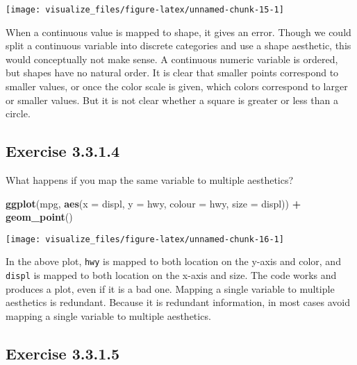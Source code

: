 \documentclass[]{book}
\newenvironment{Shaded}{\begin{snugshade}}{\end{snugshade}}
\newcommand{\DataTypeTok}[1]{\textcolor[rgb]{0.13,0.29,0.53}{#1}}
\newcommand{\KeywordTok}[1]{\textcolor[rgb]{0.13,0.29,0.53}{\textbf{#1}}}
\newcommand{\NormalTok}[1]{#1}
\newcommand{\OperatorTok}[1]{\textcolor[rgb]{0.81,0.36,0.00}{\textbf{#1}}}
\newcommand{\StringTok}[1]{\textcolor[rgb]{0.31,0.60,0.02}{#1}}
\theoremstyle{plain}
\theoremstyle{remark}
\begin{document}
\begin{center}\texttt{[image: visualize\_files/figure-latex/unnamed-chunk-15-1]} \end{center}

When a continuous value is mapped to shape, it gives an error. Though we
could split a continuous variable into discrete categories and use a
shape aesthetic, this would conceptually not make sense. A continuous
numeric variable is ordered, but shapes have no natural order. It is
clear that smaller points correspond to smaller values, or once the
color scale is given, which colors correspond to larger or smaller
values. But it is not clear whether a square is greater or less than a
circle.

\hypertarget{exercise-3.3.1.4}{%
\subsection*{\texorpdfstring{Exercise
{3.3.1.4}}{Exercise 3.3.1.4}}\label{exercise-3.3.1.4}}

What happens if you map the same variable to multiple aesthetics?

\begin{Shaded}
\begin{Highlighting}[]
\KeywordTok{ggplot}\NormalTok{(mpg, }\KeywordTok{aes}\NormalTok{(}\DataTypeTok{x =}\NormalTok{ displ, }\DataTypeTok{y =}\NormalTok{ hwy, }\DataTypeTok{colour =}\NormalTok{ hwy, }\DataTypeTok{size =}\NormalTok{ displ)) }\OperatorTok{+}
\StringTok{  }\KeywordTok{geom_point}\NormalTok{()}
\end{Highlighting}
\end{Shaded}

\begin{center}\texttt{[image: visualize\_files/figure-latex/unnamed-chunk-16-1]} \end{center}

In the above plot, \texttt{hwy} is mapped to both location on the y-axis
and color, and \texttt{displ} is mapped to both location on the x-axis
and size. The code works and produces a plot, even if it is a bad one.
Mapping a single variable to multiple aesthetics is redundant. Because
it is redundant information, in most cases avoid mapping a single
variable to multiple aesthetics.

\hypertarget{exercise-3.3.1.5}{%
\subsection*{\texorpdfstring{Exercise
{3.3.1.5}}{Exercise 3.3.1.5}}\label{exercise-3.3.1.5}}
\end{document}
